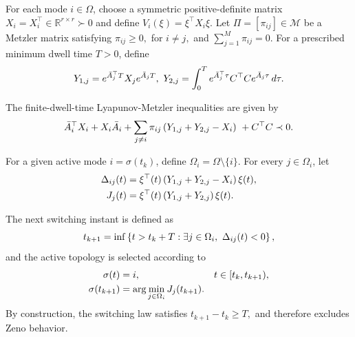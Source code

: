 \documentclass[conference]{IEEEtran}
\begin{document}
	For each mode $i\in\Omega$, choose a symmetric positive-definite
	matrix $X_i=X_i^\top\in\mathbb R^{r\times r}\succ0$ and define
	$
	V_i(\xi)=\xi^\top X_i\xi.
	$
	Let $\Pi=[\pi_{ij}]\in\mathcal{M}$ be a Metzler matrix satisfying
	$
	\pi_{ij}\geq0,
	$
	for
	$ i\neq j,
	$
	and
	$
	\sum_{j=1}^{M}\pi_{ij}=0.
	$
	For a prescribed minimum dwell time $T>0$, define
	\vspace{-0.2\baselineskip}
	\begin{equation}
		Y_{1,j}
		=
		e^{\bar A_j^\top T}X_j e^{\bar A_jT},\
		Y_{2,j}
		=
		\int_{0}^{T}
		e^{\bar A_j^\top\tau}
		C^\top C
		e^{\bar A_j\tau}
		\,d\tau .
		\label{eq:Y_definitions}
		\vspace{-0.2\baselineskip}
	\end{equation}
	
	The finite-dwell-time Lyapunov-Metzler inequalities are given by
	\vspace{-0.2\baselineskip}
	\begin{equation}
		\bar A_i^\top X_i+X_i\bar A_i
		+
		\sum_{j\neq i}
		\pi_{ij}
		\left(
		Y_{1,j}+Y_{2,j}-X_i
		\right)\
		+
		C^\top C
		\prec0.
		\label{eq:LM}
		\vspace{-0.2\baselineskip}
	\end{equation}
	
	For a given active mode $i=\sigma(t_k)$, define
	$
	\Omega_i=\Omega\setminus\{i\}.
	$
	For every $j\in\Omega_i$, let
	\vspace{-0.2\baselineskip}
	\begin{equation}
		\begin{aligned}
			\Delta_{ij}(t)
			&=
			\xi^\top(t)
			\left(
			Y_{1,j}+Y_{2,j}-X_i
			\right)
			\xi(t),\\
			J_j(t)
			&=
			\xi^\top(t)
			\left(
			Y_{1,j}+Y_{2,j}
			\right)
			\xi(t).
		\end{aligned}
		\label{eq:switching_indices}
		\vspace{-0.2\baselineskip}
	\end{equation}
	
	The next switching instant is defined as
	\vspace{-0.2\baselineskip}
	\begin{equation}
		t_{k+1}
		=
		\inf
		\left\{
		t>t_k+T:
		\exists j\in\Omega_i,\ 
		\Delta_{ij}(t)<0
		\right\},
		\label{eq:switching_time}
		\vspace{-0.2\baselineskip}
	\end{equation}
	and the active topology is selected according to
	\vspace{-0.2\baselineskip}
	\begin{equation}
		\begin{aligned}
			\sigma(t)
			&=
			i,
			&&t\in[t_k,t_{k+1}),\\
			\sigma(t_{k+1})
			&=
			\arg\min_{j\in\Omega_i}
			J_j(t_{k+1}).
		\end{aligned}
		\label{eq:switching_law}
		\vspace{-0.2\baselineskip}
	\end{equation}
	By construction, the switching law satisfies
	$
	t_{k+1}-t_k\geq T,
	$
	and therefore excludes Zeno behavior.
	
\end{document}

